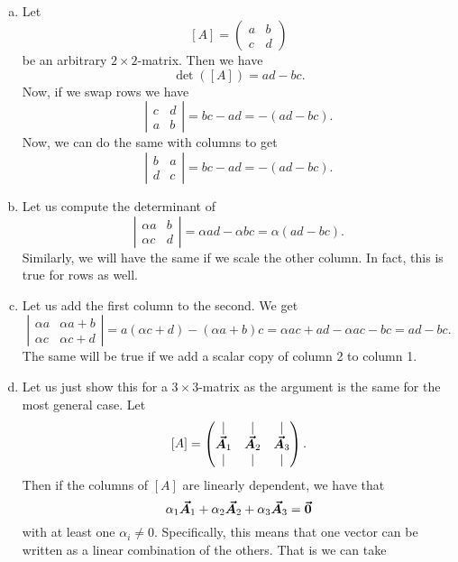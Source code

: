 \documentclass[12pt]{article} %
\begin{document}
\begin{solution}~
\begin{enumerate}[(a)]
    \item Let
    \[
    [A]=\begin{pmatrix} a & b \\ c & d \end{pmatrix}
    \]
    be an arbitrary $2\times 2$-matrix.  Then we have
    \[
    \det([A])=ad-bc.
    \]
    Now, if we swap rows we have
    \[
    \left| \begin{matrix} c & d \\ a & b \end{matrix} \right| = bc-ad = -(ad-bc).
    \]
    Now, we can do the same with columns to get
    \[
    \left| \begin{matrix} b & a \\ d & c \end{matrix} \right| = bc-ad = -(ad-bc).
    \]
    \item Let us compute the determinant of
    \[
    \left| \begin{matrix} \alpha a & b \\ \alpha c & d \end{matrix} \right| = \alpha ad - \alpha bc = \alpha(ad-bc).
    \]
    Similarly, we will have the same if we scale the other column. In fact, this is true for rows as well.
    \item Let us add the first column to the second. We get
    \[
     \left| \begin{matrix} \alpha a & \alpha a+b \\ \alpha c & \alpha c+d \end{matrix} \right| = a(\alpha c+d)-(\alpha a+b)c = \alpha ac+ad-\alpha ac-bc = ad-bc.
    \]
    The same will be true if we add a scalar copy of column 2 to column 1.
    \item Let us just show this for a $3\times 3$-matrix as the argument is the same for the most general case.  Let 
\[
[A] = \begin{pmatrix} \vert & \vert & \vert \\ \boldsymbol{\vec{A}}_1 & \boldsymbol{\vec{A}}_2 & \boldsymbol{\vec{A}}_3 \\ \vert & \vert & \vert \end{pmatrix}.
\]
Then if the columns of $[A]$ are linearly dependent, we have that
\[
\alpha_1 \boldsymbol{\vec{A}}_1 + \alpha_2 \boldsymbol{\vec{A}}_2 + \alpha_3 \boldsymbol{\vec{A}}_3 = \boldsymbol{\vec{0}}
\]
with at least one $\alpha_i\neq 0$.  Specifically, this means that one vector can be written as a linear combination of the others. That is we can take

\end{enumerate}
\end{solution}
\end{document}
